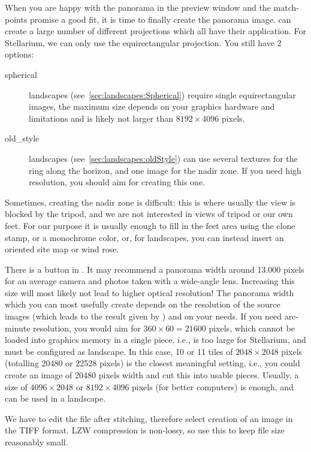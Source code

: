 When you are happy with the panorama in the preview window and the
match-points promise a good fit, it is time to finally create the
panorama image.  can create a large number of different
projections which all have their application. For Stellarium, we can
only use the equirectangular projection. You still have 2 options:

\begin{description}
\item[spherical] landscapes (see~\ref{sec:landscapes:Spherical}) require single equirectangular images, the
  maximum size depends on your graphics hardware and  limitations
  and is likely not larger than $8192\times4096$ pixels.
\item[old\_style] landscapes (see~\ref{sec:landscapes:oldStyle}) can use several textures for the ring
  along the horizon, and one image for the nadir zone. If you need
  high resolution, you should aim for creating this one.
\end{description}

Sometimes, creating the nadir zone is difficult: this is where usually
the view is blocked by the tripod, and we are not interested in views
of tripod or our own feet. For our purpose it is usually enough to
fill in the feet area using the clone stamp, or a monochrome color,
or, for  landscapes, you can instead insert an oriented site
map or wind rose.

There is a button  in . It may
recommend a panorama width around 13.000 pixels for an average camera
and photos taken with a wide-angle lens. Increasing this size will
most likely not lead to higher optical resolution!  The panorama width
which you can most usefully create depends on the resolution of the
source images (which leads to the result given by ) and on your
needs. If you need arc-minute resolution, you would aim for
$360\times60=21600$ pixels, which cannot be loaded into graphics
memory in a single piece, i.e., is too large for Stellarium, and must
be configured as  landscape. In this case, 10 or 11 tiles of
$2048\times2048$ pixels (totalling 20480 or 22528 pixels) is the closest
meaningful setting, i.e., you could create an image of 20480 pixels
width and cut this into usable pieces. Usually, a size of
$4096\times2048$ or $8192\times4096$ pixels (for better computers) is
enough, and can be used in a  landscape.

We have to edit the file after stitching, therefore select creation of
an image in the TIFF format. LZW compression is non-lossy, so use this
to keep file size reasonably small.

